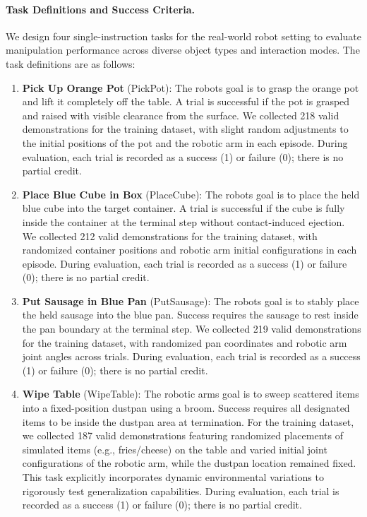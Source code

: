 \paragraph{Task Definitions and Success Criteria.}
We design four single-instruction tasks for the real-world robot setting to evaluate manipulation performance across diverse object types and interaction modes. The task definitions are as follows:
\begin{enumerate}
    \item \textbf{Pick Up Orange Pot} (PickPot): The robot\textquotesingle s goal is to grasp the orange pot and lift it completely off the table. A trial is successful if the pot is grasped and raised with visible clearance from the surface. We collected 218 valid demonstrations for the training dataset, with slight random adjustments to the initial positions of the pot and the robotic arm in each episode. During evaluation, each trial is recorded as a success (1) or failure (0); there is no partial credit.
    \item \textbf{Place Blue Cube in Box} (PlaceCube): The robot\textquotesingle s goal is to place the held blue cube into the target container. A trial is successful if the cube is fully inside the container at the terminal step without contact-induced ejection. We collected 212 valid demonstrations for the training dataset, with randomized container positions and robotic arm initial configurations in each episode. During evaluation, each trial is recorded as a success (1) or failure (0); there is no partial credit.
    \item \textbf{Put Sausage in Blue Pan} (PutSausage): The robot\textquotesingle s goal is to stably place the held sausage into the blue pan. Success requires the sausage to rest inside the pan boundary at the terminal step. We collected 219 valid demonstrations for the training dataset, with randomized pan coordinates and robotic arm joint angles across trials. During evaluation, each trial is recorded as a success (1) or failure (0); there is no partial credit.
    \item \textbf{Wipe Table} (WipeTable): The robotic arm\textquotesingle s goal is to sweep scattered items into a fixed-position dustpan using a broom. Success requires all designated items to be inside the dustpan area at termination. For the training dataset, we collected 187 valid demonstrations featuring randomized placements of simulated items (e.g., fries/cheese) on the table and varied initial joint configurations of the robotic arm, while the dustpan location remained fixed. This task explicitly incorporates dynamic environmental variations to rigorously test generalization capabilities. During evaluation, each trial is recorded as a success (1) or failure (0); there is no partial credit.
\end{enumerate}



